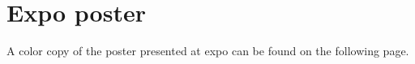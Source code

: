 \section{Expo poster}

A color copy of the poster presented at expo can be found on the following page.

\begin{figure}[H]
  \vspace*{-2.3cm}
\end{figure}
